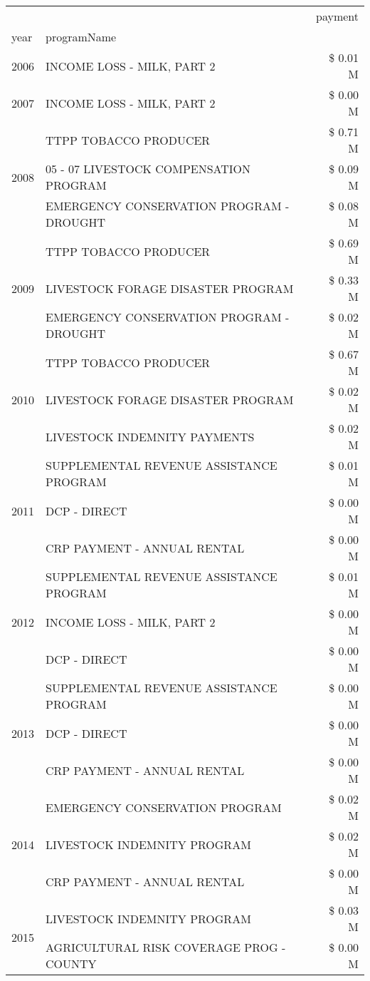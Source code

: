 \begin{tabular}{llr}
\toprule
 &  & payment \\
year & programName &  \\
\midrule
2006 & INCOME LOSS - MILK, PART 2 & \$ 0.01 M \\
\cline{1-3}
2007 & INCOME LOSS - MILK, PART 2 & \$ 0.00 M \\
\cline{1-3}
\multirow[t]{3}{*}{2008} & TTPP TOBACCO PRODUCER & \$ 0.71 M \\
 & 05 - 07 LIVESTOCK COMPENSATION PROGRAM & \$ 0.09 M \\
 & EMERGENCY CONSERVATION PROGRAM - DROUGHT & \$ 0.08 M \\
\cline{1-3}
\multirow[t]{3}{*}{2009} & TTPP TOBACCO PRODUCER & \$ 0.69 M \\
 & LIVESTOCK FORAGE DISASTER  PROGRAM & \$ 0.33 M \\
 & EMERGENCY CONSERVATION PROGRAM - DROUGHT & \$ 0.02 M \\
\cline{1-3}
\multirow[t]{3}{*}{2010} & TTPP TOBACCO PRODUCER & \$ 0.67 M \\
 & LIVESTOCK FORAGE DISASTER  PROGRAM & \$ 0.02 M \\
 & LIVESTOCK INDEMNITY PAYMENTS & \$ 0.02 M \\
\cline{1-3}
\multirow[t]{3}{*}{2011} & SUPPLEMENTAL REVENUE ASSISTANCE PROGRAM & \$ 0.01 M \\
 & DCP - DIRECT & \$ 0.00 M \\
 & CRP PAYMENT - ANNUAL RENTAL & \$ 0.00 M \\
\cline{1-3}
\multirow[t]{3}{*}{2012} & SUPPLEMENTAL REVENUE ASSISTANCE PROGRAM & \$ 0.01 M \\
 & INCOME LOSS - MILK, PART 2 & \$ 0.00 M \\
 & DCP - DIRECT & \$ 0.00 M \\
\cline{1-3}
\multirow[t]{3}{*}{2013} & SUPPLEMENTAL REVENUE ASSISTANCE PROGRAM & \$ 0.00 M \\
 & DCP - DIRECT & \$ 0.00 M \\
 & CRP PAYMENT - ANNUAL RENTAL & \$ 0.00 M \\
\cline{1-3}
\multirow[t]{3}{*}{2014} & EMERGENCY CONSERVATION PROGRAM & \$ 0.02 M \\
 & LIVESTOCK INDEMNITY PROGRAM & \$ 0.02 M \\
 & CRP PAYMENT - ANNUAL RENTAL & \$ 0.00 M \\
\cline{1-3}
\multirow[t]{3}{*}{2015} & LIVESTOCK INDEMNITY PROGRAM & \$ 0.03 M \\
 & AGRICULTURAL RISK COVERAGE PROG - COUNTY & \$ 0.00 M \\

\end{tabular}
